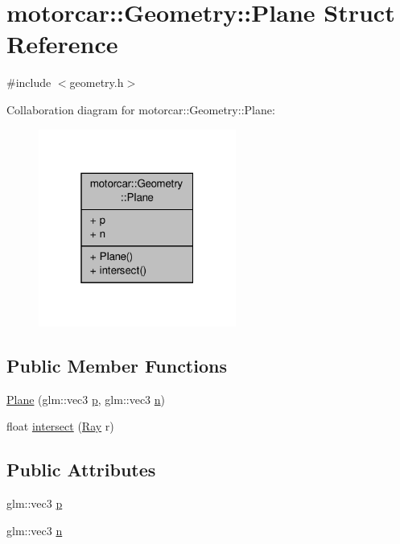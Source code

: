 \hypertarget{structmotorcar_1_1Geometry_1_1Plane}{\section{motorcar\-:\-:Geometry\-:\-:Plane Struct Reference}
\label{structmotorcar_1_1Geometry_1_1Plane}
}


{\ttfamily \#include $<$geometry.\-h$>$}



Collaboration diagram for motorcar\-:\-:Geometry\-:\-:Plane\-:
\nopagebreak
\begin{figure}[H]
\begin{center}
\leavevmode
\includegraphics[width=184pt]{structmotorcar_1_1Geometry_1_1Plane__coll__graph}
\end{center}
\end{figure}
\subsection*{Public Member Functions}
\begin{DoxyCompactItemize}
\item 
\hyperlink{structmotorcar_1_1Geometry_1_1Plane_aa50a62c6e979384b4026a1ba81a29c19}{Plane} (glm\-::vec3 \hyperlink{structmotorcar_1_1Geometry_1_1Plane_ad1aa2ffa451147b0fe911f5b78c10500}{p}, glm\-::vec3 \hyperlink{structmotorcar_1_1Geometry_1_1Plane_adc343be1d51473ca22505d7427a7631c}{n})
\item 
float \hyperlink{structmotorcar_1_1Geometry_1_1Plane_a108d18bf80259951130d1b2b7e8bf8ce}{intersect} (\hyperlink{structmotorcar_1_1Geometry_1_1Ray}{Ray} r)
\end{DoxyCompactItemize}
\subsection*{Public Attributes}
\begin{DoxyCompactItemize}
\item 
glm\-::vec3 \hyperlink{structmotorcar_1_1Geometry_1_1Plane_ad1aa2ffa451147b0fe911f5b78c10500}{p}
\item 
glm\-::vec3 \hyperlink{structmotorcar_1_1Geometry_1_1Plane_adc343be1d51473ca22505d7427a7631c}{n}
\end{DoxyCompactItemize}


